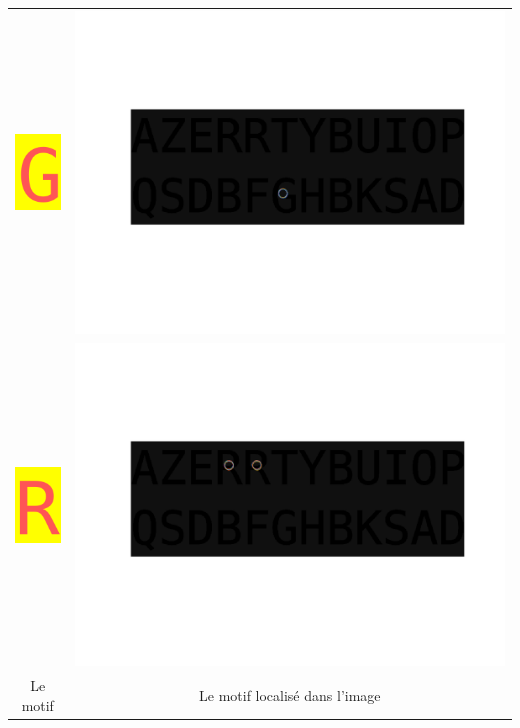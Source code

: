 \documentclass[a4paper,12pt,titlepage]{report}
\begin{document}
\begin{tabular}{|c|c|}
			\includegraphics[scale=0.5]{../motif2.png} & \includegraphics[scale=0.2]{illus/motiflocal2.png}\\
			\includegraphics[scale=0.5]{../motif3.png} & \includegraphics[scale=0.2]{illus/motiflocal3.png}\\
			Le motif  & Le motif localisé dans l'image\\
	\end{tabular}\\
\end{document}
